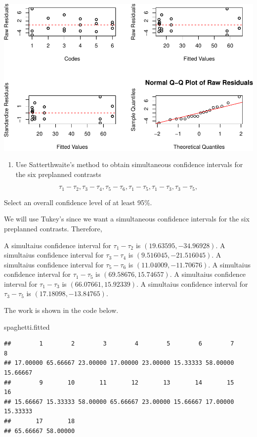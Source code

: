 \documentclass[12pt,]{article}
\newenvironment{Shaded}{\begin{snugshade}}{\end{snugshade}}
\newcommand{\NormalTok}[1]{#1}
\providecommand{\tightlist}{%
  \setlength{\itemsep}{0pt}\setlength{\parskip}{0pt}}
\begin{document}
\includegraphics{Markdown_HW_5_files/figure-latex/unnamed-chunk-6-1.pdf}

\begin{enumerate}
\def\labelenumi{(\alph{enumi})}
\setcounter{enumi}{1}
\tightlist
\item
  Use Satterthwaite's method to obtain simultaneous confidence intervals
  for the six preplanned contrasts
\end{enumerate}

\[\tau_1 -\tau_2, \tau_3 -\tau_4, \tau_5 -\tau_6, \tau_1 -\tau_5, \tau_1 -\tau_3, \tau_3 -\tau_5,\]

Select an overall confidence level of at least 95\%.

We will use Tukey's since we want a simultaneous confidence intervals
for the six preplanned contrasts. Therefore,

A simultaius confidence interval for \(\tau_1 -\tau_2\) is
\((19.63595,-34.96928)\). A simultaius confidence interval for
\(\tau_3 -\tau_4\) is \((9.516045,-21.516045)\). A simultaius confidence
interval for \(\tau_5 -\tau_6\) is \((11.04009,-11.70676)\). A
simultaius confidence interval for \(\tau_1 -\tau_5\) is
\((69.58676,15.74657)\). A simultaius confidence interval for
\(\tau_1 -\tau_3\) is \((66.07661,15.92339)\). A simultaius confidence
interval for \(\tau_3 -\tau_5\) is \((17.18098,-13.84765)\).

The work is shown in the code below.

\begin{Shaded}
\begin{Highlighting}[]
\NormalTok{spaghetti.fitted}
\end{Highlighting}
\end{Shaded}

\begin{verbatim}
##        1        2        3        4        5        6        7        8 
## 17.00000 65.66667 23.00000 17.00000 23.00000 15.33333 58.00000 15.66667 
##        9       10       11       12       13       14       15       16 
## 15.66667 15.33333 58.00000 65.66667 23.00000 15.66667 17.00000 15.33333 
##       17       18 
## 65.66667 58.00000
\end{verbatim}
\end{document}
